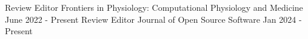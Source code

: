 


\begin{cventries}

  \cventry
    {Review Editor} %
    {Frontiers in Physiology: Computational Physiology and Medicine} %
    {} %
    {June 2022 - Present} %
    {
    }
  \cventry
    {Review Editor} %
    {Journal of Open Source Software} %
    {} %
    {Jan 2024 - Present} %
    {
    }
    
\end{cventries}
